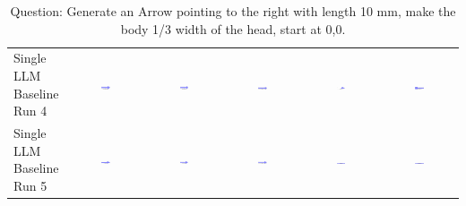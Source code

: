 \begin{table}
\begin{tabular}{@{}lccccc@{}}
    \makecell{Single LLM \\ Baseline \\ Run 4} & \includegraphics[width=0.13\textwidth]{./run_4/png/gpt-4o_results/Arrow.png} & \includegraphics[width=0.13\textwidth]{./run_4/png/o1-preview_results/Arrow.png} & \includegraphics[width=0.13\textwidth]{./run_4/png/claude-3-5-sonnet-20240620_results/Arrow.png} & \includegraphics[width=0.13\textwidth]{./run_4/png/watsonx_meta-llama_llama-3-1-70b-instruct_results/Arrow.png} & \includegraphics[width=0.13\textwidth]{./run_4/png/watsonx_meta-llama_llama-3-405b-instruct_results/Arrow.png} \\
    \makecell{Single LLM \\ Baseline \\ Run 5} & \includegraphics[width=0.13\textwidth]{./run_5/png/gpt-4o_results/Arrow.png} & \includegraphics[width=0.13\textwidth]{./run_5/png/o1-preview_results/Arrow.png} & \includegraphics[width=0.13\textwidth]{./run_5/png/claude-3-5-sonnet-20240620_results/Arrow.png} & \includegraphics[width=0.13\textwidth]{./run_5/png/watsonx_meta-llama_llama-3-1-70b-instruct_results/Arrow.png} & \includegraphics[width=0.13\textwidth]{./run_5/png/watsonx_meta-llama_llama-3-405b-instruct_results/Arrow.png} \\
    \bottomrule
  \end{tabular}
  \caption*{Question: Generate an Arrow pointing to the right with length 10 mm, make the body 1/3 width of the head, start at 0,0.}
\end{table}

